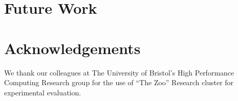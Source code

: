 \documentclass[sigconf]{acmart}
\begin{document}
\section{Future Work}

\section*{Acknowledgements}
We thank our colleagues at The University of Bristol's High Performance Computing Research group for the use of ``The Zoo'' Research cluster for experimental evaluation.





\newpage
\listoftodos[Notes]
\end{document}
